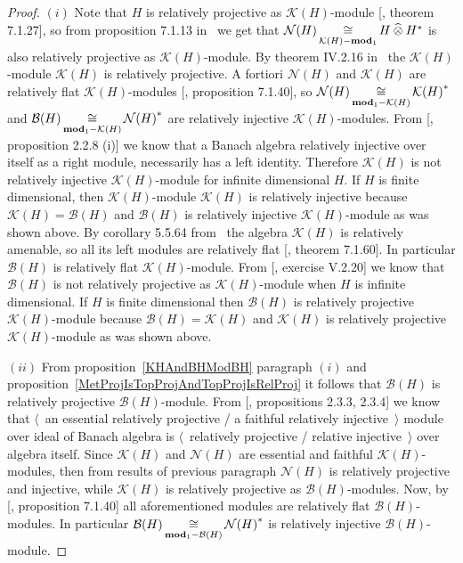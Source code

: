 \begin{proof} $(i)$ Note that $H$ is relatively projective as
$\mathcal{K}(H)$-module [\cite{HelBanLocConvAlg}, theorem 7.1.27], so from
proposition 7.1.13 in~\cite{HelBanLocConvAlg} we get that
$\mathcal{N}(H)\mathop{\mathbin{\cong}}\limits_{\mathcal{K}(H)-\mathbf{mod}_1}H\mathbin{\widehat{\otimes}} H^*$ is also
relatively projective as $\mathcal{K}(H)$-module. By theorem IV.2.16
in~\cite{HelHomolBanTopAlg} the $\mathcal{K}(H)$-module $\mathcal{K}(H)$ is
relatively projective. A fortiori $\mathcal{N}(H)$ and $\mathcal{K}(H)$ are
relatively flat $\mathcal{K}(H)$-modules 
[\cite{HelBanLocConvAlg}, proposition 7.1.40], 
so $\mathcal{N}(H)\mathop{\mathbin{\cong}}\limits_{\mathbf{mod}_1-\mathcal{K}(H)}{\mathcal{K}(H)}^*$
and  $\mathcal{B}(H)\mathop{\mathbin{\cong}}\limits_{\mathbf{mod}_1-\mathcal{K}(H)}{\mathcal{N}(H)}^*$ are
relatively injective $\mathcal{K}(H)$-modules. From
[\cite{RamsHomPropSemgroupAlg}, proposition 2.2.8  (i)] we know that a Banach
algebra relatively injective over itself as a right module, necessarily has a
left identity. Therefore $\mathcal{K}(H)$ is not relatively injective
$\mathcal{K}(H)$-module for infinite dimensional $H$. If $H$ is finite
dimensional, then $\mathcal{K}(H)$-module $\mathcal{K}(H)$ is relatively
injective because $\mathcal{K}(H)=\mathcal{B}(H)$ and $\mathcal{B}(H)$ is
relatively injective $\mathcal{K}(H)$-module as was shown above. By corollary
5.5.64 from~\cite{DalBanAlgAutCont} the algebra $\mathcal{K}(H)$ is relatively
amenable, so all its left modules are relatively flat [\cite{HelBanLocConvAlg},
theorem 7.1.60]. In particular $\mathcal{B}(H)$ is relatively flat
$\mathcal{K}(H)$-module. From [\cite{HelHomolBanTopAlg}, exercise V.2.20] we
know that $\mathcal{B}(H)$ is not relatively projective as
$\mathcal{K}(H)$-module when $H$ is infinite dimensional. If $H$ is finite
dimensional then $\mathcal{B}(H)$ is relatively projective
$\mathcal{K}(H)$-module because $\mathcal{B}(H)=\mathcal{K}(H)$ and
$\mathcal{K}(H)$ is relatively projective $\mathcal{K}(H)$-module as was shown
above.

$(ii)$ From proposition~\ref{KHAndBHModBH} paragraph $(i)$ and
proposition~\ref{MetProjIsTopProjAndTopProjIsRelProj} it follows that
$\mathcal{B}(H)$ is relatively projective $\mathcal{B}(H)$-module. From
[\cite{RamsHomPropSemgroupAlg}, propositions 2.3.3, 2.3.4] we know that
$\langle$~an essential relatively projective / a faithful relatively
injective~$\rangle$ module over ideal of Banach algebra is $\langle$~relatively
projective / relative injective~$\rangle$ over algebra itself. Since
$\mathcal{K}(H)$ and $\mathcal{N}(H)$ are essential and faithful
$\mathcal{K}(H)$-modules, then from results of previous paragraph
$\mathcal{N}(H)$ is relatively projective and injective, while $\mathcal{K}(H)$
is relatively projective as $\mathcal{B}(H)$-modules. Now, by
[\cite{HelBanLocConvAlg}, proposition 7.1.40] all aforementioned modules are
relatively flat $\mathcal{B}(H)$-modules. In particular
$\mathcal{B}(H)\mathop{\mathbin{\cong}}\limits_{\mathbf{mod}_1-\mathcal{B}(H)}{\mathcal{N}(H)}^*$ is
relatively injective $\mathcal{B}(H)$-module.
\end{proof}

